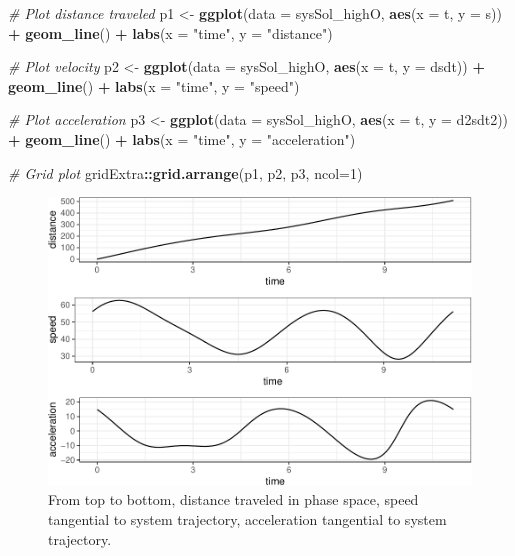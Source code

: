 \documentclass[12pt,twoside,openany]{reedthesis}
\newenvironment{Shaded}{\begin{snugshade}}{\end{snugshade}}
\newcommand{\CommentTok}[1]{\textcolor[rgb]{0.56,0.35,0.01}{\textit{#1}}}
\newcommand{\DataTypeTok}[1]{\textcolor[rgb]{0.13,0.29,0.53}{#1}}
\newcommand{\DecValTok}[1]{\textcolor[rgb]{0.00,0.00,0.81}{#1}}
\newcommand{\KeywordTok}[1]{\textcolor[rgb]{0.13,0.29,0.53}{\textbf{#1}}}
\newcommand{\NormalTok}[1]{#1}
\newcommand{\OperatorTok}[1]{\textcolor[rgb]{0.81,0.36,0.00}{\textbf{#1}}}
\newcommand{\StringTok}[1]{\textcolor[rgb]{0.31,0.60,0.02}{#1}}
\begin{document}
\begin{Shaded}
\begin{Highlighting}[]
\CommentTok{# Plot distance traveled}
\NormalTok{p1 <-}\StringTok{ }\KeywordTok{ggplot}\NormalTok{(}\DataTypeTok{data =}\NormalTok{ sysSol_highO, }\KeywordTok{aes}\NormalTok{(}\DataTypeTok{x =}\NormalTok{ t, }\DataTypeTok{y =}\NormalTok{ s)) }\OperatorTok{+}
\StringTok{  }\KeywordTok{geom_line}\NormalTok{() }\OperatorTok{+}
\StringTok{  }\KeywordTok{labs}\NormalTok{(}\DataTypeTok{x =} \StringTok{"time"}\NormalTok{, }\DataTypeTok{y =} \StringTok{"distance"}\NormalTok{)}

\CommentTok{# Plot velocity}
\NormalTok{p2 <-}\StringTok{ }\KeywordTok{ggplot}\NormalTok{(}\DataTypeTok{data =}\NormalTok{ sysSol_highO, }\KeywordTok{aes}\NormalTok{(}\DataTypeTok{x =}\NormalTok{ t, }\DataTypeTok{y =}\NormalTok{ dsdt)) }\OperatorTok{+}
\StringTok{  }\KeywordTok{geom_line}\NormalTok{() }\OperatorTok{+}
\StringTok{  }\KeywordTok{labs}\NormalTok{(}\DataTypeTok{x =} \StringTok{"time"}\NormalTok{, }\DataTypeTok{y =} \StringTok{"speed"}\NormalTok{)}

\CommentTok{# Plot acceleration}
\NormalTok{p3 <-}\StringTok{ }\KeywordTok{ggplot}\NormalTok{(}\DataTypeTok{data =}\NormalTok{ sysSol_highO, }\KeywordTok{aes}\NormalTok{(}\DataTypeTok{x =}\NormalTok{ t, }\DataTypeTok{y =}\NormalTok{ d2sdt2)) }\OperatorTok{+}
\StringTok{  }\KeywordTok{geom_line}\NormalTok{() }\OperatorTok{+}
\StringTok{  }\KeywordTok{labs}\NormalTok{(}\DataTypeTok{x =} \StringTok{"time"}\NormalTok{, }\DataTypeTok{y =} \StringTok{"acceleration"}\NormalTok{)}

\CommentTok{# Grid plot}
\NormalTok{gridExtra}\OperatorTok{::}\KeywordTok{grid.arrange}\NormalTok{(p1, p2, p3, }\DataTypeTok{ncol=}\DecValTok{1}\NormalTok{)}
\end{Highlighting}
\end{Shaded}
\begin{figure}
\centering
\includegraphics{_myDissertation_files/figure-latex/distSpeedAccel-1.pdf}
\caption{\label{fig:distSpeedAccel}From top to bottom, distance traveled in phase space, speed tangential to system trajectory, acceleration tangential to system trajectory.}
\end{figure}
\end{document}

